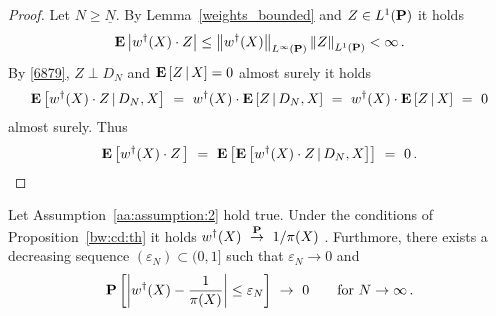 \begin{proof}
  Let
  $N\ge\underline{N}$.
  By Lemma~\ref{weights_bounded} and 
  $Z\in L^1(\P)$
  it holds
  \begin{gather}
    \label{6879}
  \E
  \left|
  w^\dagger(X)\cdot Z
  \right|
  \le
  \norm{w^\dagger(X)}_{L^\infty(\P)}
  \norm{Z}_{L^1(\P)}
  <\infty
  \,.
  \end{gather}
  By 
  \eqref{6879},
  $Z\perp D_N$
  and
  $
\E
\left[
  Z
  \,
  |
  \, 
  X
\right]
= 0
  $
  almost surely
  it holds 
  \begin{gather*}
    \E
  \left[
  w^\dagger(X)
  \cdot
  Z
  \,
  |
  \,
  D_N,X
  \right]
  \ 
  =
  \ 
  w^\dagger(X)
  \cdot
  \E
  \left[
  Z
  \,
  |
  \,
  D_N,X
  \right]
  \ 
  =
  \ 
  w^\dagger(X)
  \cdot
  \E
  \left[
  Z
  \,
  |
  \,
  X
  \right]
  \
  =
  \ 
  0
  \end{gather*}
  almost surely.
  Thus
  \begin{gather*}
    \E
    \left[
  w^\dagger(X)
  \cdot
  Z
  \,
    \right]
    \ 
    =
    \ 
    \E
    \left[
 \E
  \left[
  w^\dagger(X)
  \cdot
  Z
  \,
  |
  \,
  D_N,X
  \right]
    \right]
    \ 
    =
    \ 
    0
    \,.
     \end{gather*}
\end{proof}
\begin{ftheorem}
  \label{aa:weights:th}
  Let Assumption~\ref{aa:assumption:2} hold true.
  Under the conditions of Proposition~\ref{bw:cd:th} 
  it holds
  $w^\dagger(X)\ 
  \overset{\P}{\to}
  \ 
  1/\pi(X)
  $
  .
  Furthmore, there exists a decreasing sequence $(\varepsilon_N)\subset(0,1]$ such that $\varepsilon_N\to 0$ and 
  \begin{gather}
    \P
    \left[ 
  \left| 
  w^\dagger(X)
  -
  \frac{1}{\pi(X)}
  \right|
    \le
    \varepsilon_N
    \right]
  \  
  \to
  \  
  0
  \qquad
  \text{for}
  \ 
  N\to\infty
  \,.
  \end{gather}
\end{ftheorem}
